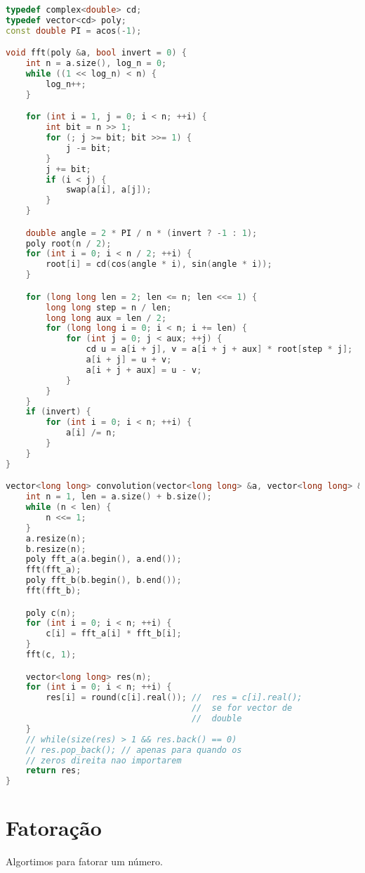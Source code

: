 \documentclass[10pt, a4paper, oneside]{book}
\begin{document}
\begin{lstlisting}[language=C++]
typedef complex<double> cd;
typedef vector<cd> poly;
const double PI = acos(-1);

void fft(poly &a, bool invert = 0) {
    int n = a.size(), log_n = 0;
    while ((1 << log_n) < n) {
        log_n++;
    }

    for (int i = 1, j = 0; i < n; ++i) {
        int bit = n >> 1;
        for (; j >= bit; bit >>= 1) {
            j -= bit;
        }
        j += bit;
        if (i < j) {
            swap(a[i], a[j]);
        }
    }

    double angle = 2 * PI / n * (invert ? -1 : 1);
    poly root(n / 2);
    for (int i = 0; i < n / 2; ++i) {
        root[i] = cd(cos(angle * i), sin(angle * i));
    }

    for (long long len = 2; len <= n; len <<= 1) {
        long long step = n / len;
        long long aux = len / 2;
        for (long long i = 0; i < n; i += len) {
            for (int j = 0; j < aux; ++j) {
                cd u = a[i + j], v = a[i + j + aux] * root[step * j];
                a[i + j] = u + v;
                a[i + j + aux] = u - v;
            }
        }
    }
    if (invert) {
        for (int i = 0; i < n; ++i) {
            a[i] /= n;
        }
    }
}

vector<long long> convolution(vector<long long> &a, vector<long long> &b) {
    int n = 1, len = a.size() + b.size();
    while (n < len) {
        n <<= 1;
    }
    a.resize(n);
    b.resize(n);
    poly fft_a(a.begin(), a.end());
    fft(fft_a);
    poly fft_b(b.begin(), b.end());
    fft(fft_b);

    poly c(n);
    for (int i = 0; i < n; ++i) {
        c[i] = fft_a[i] * fft_b[i];
    }
    fft(c, 1);

    vector<long long> res(n);
    for (int i = 0; i < n; ++i) {
        res[i] = round(c[i].real()); //  res = c[i].real();
                                     //  se for vector de
                                     //  double
    }
    // while(size(res) > 1 && res.back() == 0)
    // res.pop_back(); // apenas para quando os
    // zeros direita nao importarem
    return res;
}
\end{lstlisting}
\hfill

\section{Fatoração}


Algortimos para fatorar um número.
\end{document}
